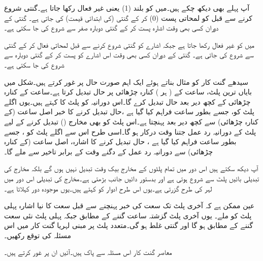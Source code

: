  آپ پہلے بھی دیکھ چکے ہیں۔میں 
 کو بلند (1) یعنی غیر فعال رکھا جاتا ہے۔گنتی شروع کرنے سے قبل  کو لمحاتی پست (0) کر کے گنتی (کی ابتدائی قیمت)  کی جاتی ہے۔ گنتی کے دوران کسی بھی وقت  اشارہ پست کر کے گنتی دوبارہ صفر سے شروع کی جا سکتی ہے۔

 میں  کو غیر فعال رکھا جاتا ہے جبکہ  اشارے کو گنتی شروع کرنے سے قبل لمحاتی فعال کر کے گنتی  سے شروع کی جاتی ہے۔ گنتی کے دوران کسی بھی وقت اس اشارے کو پست کر کے گنتی دوبارہ  سے شروع کی جا سکتی ہے۔

سیدھے گنت کار کو مثال بناتے ہوئے ایک اہم صورت حال پر غور کرتے ہیں۔شکل میں بایاں ترین پلٹ، ساعت کے ( ہر ) کنارہ چڑھائی پر حال تبدیل کرتا ہے۔ساعت کے کنارہ چڑھائی کے کچھ دیر بعد 
 حال تبدیل کرے گا۔اس دورانیہ کو پلٹ کا کہتے ہیں۔یوں اگلے پلٹ کو، جسے  بطور ساعت فراہم کیا گیا ہے ،حال تبدیل کرنے کا خبر اصل ساعت (کے کنارہ چڑھائی) سے کچھ دیر بعد پہنچتا ہے۔اس پلٹ کو بھی مخارج () تبدیل کرنے کے لیے پلٹ کے دورانیہ رد عمل جتنا وقت درکار ہو گا۔اسی طرح اس سے اگلے پلٹ کو ، جسے  بطور ساعت فراہم کیا گیا ہے ، حال تبدیل کرنے کا اشارہ، اصل ساعت (کے کنارہ چڑھائی) سے دورانیہ رد عمل کے دگنے وقت کے برابر تاخیر سے ملے گا۔

آپ دیکھ سکتے ہیں اس دور میں تمام پلٹوں کے مخارج بیک وقت تبدیل نہیں ہوں گے بلکہ مخارج کی تبدیلی بائیں پلٹ سے شروع ہوتی ہے اور بدستور دائیں جانب بڑھتی ہے۔مخارج کی تبدیلی اس دور میں لہر کی طرح گزرتی ہے۔یوں اس طرح ادوار کو  کہتے ہیں۔یوں موجودہ دور کہلاتا ہے۔

عین ممکن ہے کہ آخری پلٹ تک سعت کی خبر پہنچنے سے قبل سعت کا نیا اشارہ پہلی پلٹ کو ملے۔ یوں آخری پلٹ گزشتہ ساعت گننے کے مطابق جبکہ پہلی پلٹ نئی سعت گننے کے مطابق ہو گا اور گنتی غلط ہو گی۔متعدد پلٹ پر مبنی لہریا گنت کار میں اس مسئلہ کی توقع رکھیں۔ 

 معاصر گنت کار اس مسئلہ سے پاک ہیں۔آئیں ان پر غور کرتے ہیں۔
 
